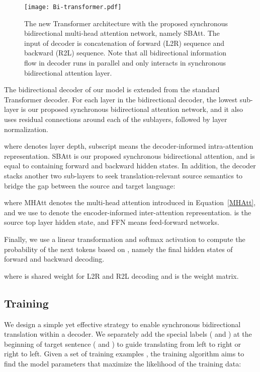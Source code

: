 \documentclass[11pt,a4paper]{article}
\begin{document}
\begin{CJK*}{UTF8}{gbsn}
\begin{figure}
	\centering
	\texttt{[image: Bi-transformer.pdf]}
	\caption{The new Transformer architecture with the proposed synchronous bidirectional multi-head attention network, namely SBAtt.
		The input of decoder is concatenation of forward (L2R) sequence and backward (R2L) sequence. Note that all bidirectional information flow in decoder runs in parallel and only interacts in synchronous bidirectional attention layer.
	}\label{Bi-transformer}
\end{figure}


The bidirectional decoder of our model is extended from the standard Transformer decoder.
For each layer in the bidirectional decoder, the lowest sub-layer is our proposed synchronous bidirectional attention network, and it also uses residual connections around each of the sublayers, followed by layer normalization.

where  denotes layer depth, subscript  means the decoder-informed intra-attention representation. SBAtt is our proposed synchronous bidirectional attention, and  is equal to  containing forward and backward hidden states.
In addition, the decoder stacks another two sub-layers to seek translation-relevant source semantics to bridge the gap between the source and target language:

where MHAtt denotes the multi-head attention introduced in Equation~\ref{MHAtt}, and we use  to denote the encoder-informed inter-attention representation.  is the source top layer hidden state, and FFN means feed-forward networks.

Finally, we use a linear transformation and softmax activation to compute the probability of the next tokens based on , namely the final hidden states of forward and backward decoding.

where  is shared weight for L2R and R2L decoding and  is the weight matrix.


\subsection{Training} \label{Training-sec}
We design a simple yet effective strategy to enable synchronous bidirectional translation within a decoder. 
We separately add the special labels ( and ) at the beginning of target sentence ( and ) to guide translating from left to right or right to left.
Given a set of training examples , the training algorithm aims to find the model parameters that maximize the likelihood of the training data:



\end{CJK*}
\end{document}
